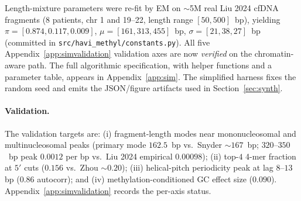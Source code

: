 Length-mixture parameters were re-fit by EM on $\sim$5M real Liu 2024 cfDNA fragments (8 patients, chr 1 and 19--22, length range $[50, 500]$~bp), yielding $\pi = [0.874, 0.117, 0.009]$, $\mu = [161, 313, 455]$~bp, $\sigma = [21, 38, 27]$~bp (committed in \texttt{src/havi\_methyl/constants.py}). All five Appendix~\ref{app:simvalidation} validation axes are now \emph{verified} on the chromatin-aware path. The full algorithmic specification, with helper functions and a parameter table, appears in Appendix~\ref{app:sim}. The simplified harness fixes the random seed and emits the JSON/figure artifacts used in Section~\ref{sec:synth}.

\paragraph{Validation.} The validation targets are: (i) fragment-length modes near mononucleosomal and multinucleosomal peaks (primary mode $162.5$~bp vs.\ Snyder $\sim 167$~bp; $320$--$350$~bp peak $0.0012$ per bp vs.\ Liu 2024 empirical $0.00098$); (ii) top-$4$ 4-mer fraction at $5'$ cuts ($0.156$ vs.\ Zhou $\sim 0.20$); (iii) helical-pitch periodicity peak at lag $8$--$13$ bp ($0.86$ autocorr); and (iv) methylation-conditioned GC effect size ($0.090$). Appendix~\ref{app:simvalidation} records the per-axis status.

